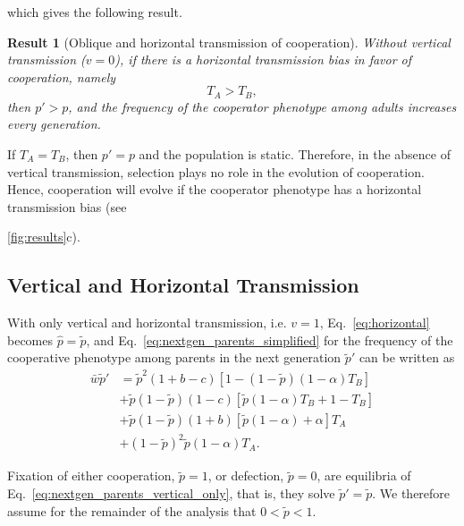 \documentclass[12pt]{extarticle}
\newtheorem{result}{Result}
\begin{document}
which gives the following result.\\

\begin{result}[Oblique and horizontal transmission of cooperation] \label{result:obli_hori}
Without vertical transmission ($v=0$), if there is a horizontal transmission bias in favor of cooperation, namely
\begin{equation} \label{eq:oblique_only_result}
T_A > T_B, 
\end{equation}
then $p'>p$, and the frequency of the cooperator phenotype among adults increases every generation.
\end{result}

If $T_A = T_B$, then $p'=p$ and the population is static.
Therefore, in the absence of vertical transmission, selection plays no role in the evolution of cooperation. Hence, cooperation will evolve if the cooperator phenotype has a horizontal transmission bias (see~{\autoref{fig:results}c).



\subsection*{Vertical and Horizontal Transmission}

With only vertical and horizontal transmission, i.e. $v=1$, Eq.\ \ref{eq:horizontal} becomes
$\hat{p} =  \tilde{p}$,
and Eq.\ \ref{eq:nextgen_parents_simplified} for the frequency of the cooperative phenotype among parents in the next generation $\tilde{p}'$ can be written as
\begin{equation} \label{eq:nextgen_parents_vertical_only} 
\begin{aligned}
\bar{w} \tilde{p}' 
& = \tilde{p}^2 (1+b-c) [1 - (1-\tilde{p}) (1-\alpha) T_B] \\
& + \tilde{p}(1-\tilde{p}) (1-c) [\tilde{p} (1-\alpha) T_B + 1 - T_B] \\
& + \tilde{p}(1-\tilde{p}) (1+b) [\tilde{p} (1-\alpha) + \alpha] T_A \\
& + (1-\tilde{p})^2 \tilde{p} (1-\alpha) T_A .
\end{aligned}
\end{equation}

Fixation of either cooperation, $\tilde{p}=1$, or defection, 
$\tilde{p}=0$, are equilibria of Eq.\ \ref{eq:nextgen_parents_vertical_only}, that is, they solve $\tilde{p}'= \tilde{p}$.
We therefore assume for the remainder of the analysis that $0<\tilde{p}<1$.

}
\end{document}
